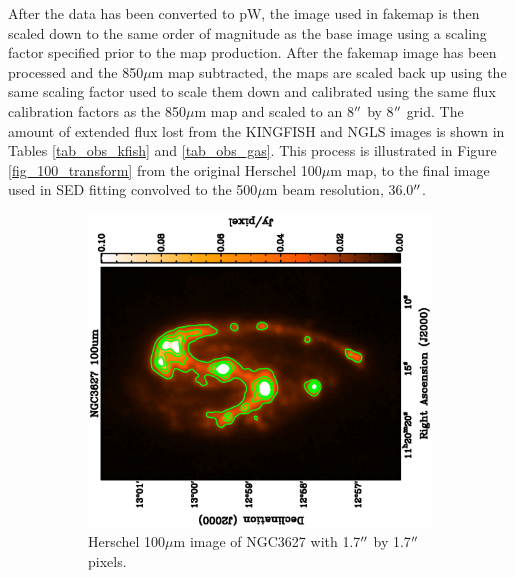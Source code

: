 After the data has been converted to pW, the image used in fakemap is then scaled down to the same order of magnitude as the base image using a scaling factor specified prior to the map production.  After the fakemap image has been processed and the 850$\mu$m map subtracted, the maps are scaled back up using the same scaling factor used to scale them down and calibrated using the same flux calibration factors as the 850$\mu$m map and scaled to an 8$\mbox{$^{\prime\prime}$}$ by 8$\mbox{$^{\prime\prime}$}$ grid.  The amount of extended flux lost from the KINGFISH and NGLS images is shown in Tables \ref{tab_obs_kfish} and \ref{tab_obs_gas}.  This process is illustrated in Figure \ref{fig_100_transform} from the original Herschel 100$\mu$m map, to the final image used in SED fitting convolved to the 500$\mu$m beam resolution, 36.0$\mbox{$^{\prime\prime}$}$.

\begin{figure}
  \centering
  \begin{subfigure}[t]{.48\textwidth}
    \centering
    \includegraphics[width=1.\linewidth, angle=270]{obs_imgs/100_orig.eps}
    \caption{Herschel 100$\mu$m image of NGC3627 with 1.7$\mbox{$^{\prime\prime}$}$ by 1.7$\mbox{$^{\prime\prime}$}$ pixels.}
  \end{subfigure}%
  \quad
  \begin{subfigure}[t]{.48\textwidth}
    \centering

\end{subfigure}
\end{figure}

